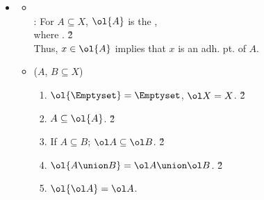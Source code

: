 \documentclass[dvipdfmx,a4paper,titlepage,9pt]{jsarticle}
\begin{document}
\begin{multicols*}{2}
\begin{itemize}[label=-]
\begin{itemize}[label={\Cdot}]
\item{} ($A$, $B\subseteq X$, $x\in X$)
\begin{enumerate}[label=(\alph*)]
\setlength{\leftskip}{-5pt}
\item $x$: adh. \!pt. \!of $A$\quad iff\quad$\forall\epsilon>0$; $S(x,\,\epsilon)\cap A\neq\Emptyset$. \v2
\item If $x$: adh. \!pt. \!of $A$; $A\neq\Emptyset$. \v2
\item If $x$: adh. \!pt. \!of $A$ $\wedge$ $A\subseteq B$; \\
$x$: adh. \!pt. \!of $B$. \v2
\item If $x$: adh. \!pt. \!of $A\union B$; \\
$x$: adh. \!pt. \!of $A$ $\vee$ adh. \!pt. \!of $B$. \v2
\item If $x\in A$; $x$: adh. \!pt. \!of $A$. \v2
\item $x$: adh. \!pt. \!of $A$\quad iff\quad $\{x\}$ \& $A$: nhb. \!rel. \v5
\item[] \h{-20}\\
\end{enumerate}
\end{itemize}

\item{}
\begin{itemize}[label={\Cdot}]
\setlength{\leftskip}{-5pt}
\item{} \\
: For $A\subseteq X$, $\ol{A}$ is the , \\
\;\;where . \v2\\
\;\;Thus, $x\in \ol{A}$ implies that $x$ is an adh. \!pt. \!of $A$. \\

\item{} ($A$, $B\subseteq X$)
\begin{enumerate}[label=(\alph*)]
\setlength{\leftskip}{-5pt}
\item $\ol{\Emptyset}=\Emptyset$, $\ol X=X$. \v2
\item $A\subseteq \ol{A}$.  \v2
\item If $A\subseteq B$; $\ol A\subseteq \ol B$. \v2
\item $\ol{A\union B}=\ol A\union \ol B$. \v2
\item $\ol{\ol A}=\ol A$.
\end{enumerate}
\end{itemize}


\end{itemize}
\end{multicols*}
\end{document}
